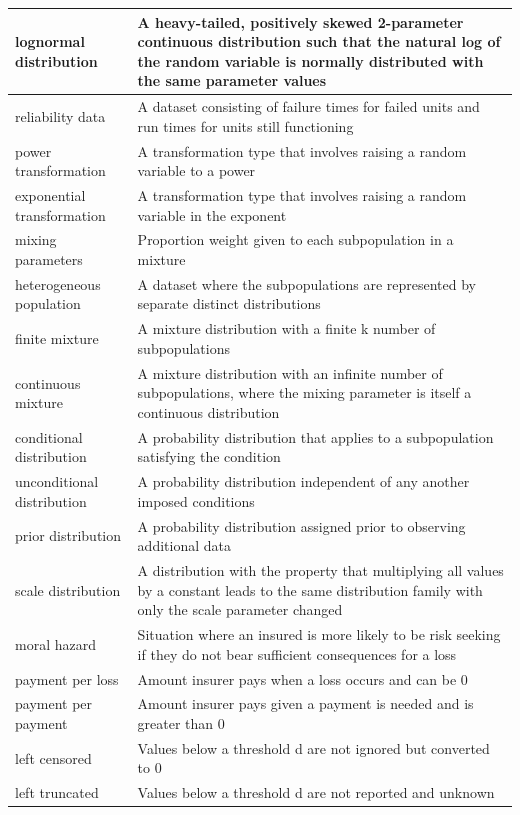 \documentclass[
]{book}
\begin{document}
\begin{longtable}{>{\raggedright\arraybackslash}p{10em}|>{\raggedright\arraybackslash}p{30em}}
\hline
lognormal distribution & A heavy-tailed, positively skewed 2-parameter continuous distribution such that the natural log of the random variable is normally distributed with the same parameter values\\
\hline
reliability data & A dataset consisting of failure times for failed units and run times for units still functioning\\
\hline
power transformation & A transformation type that involves raising a random variable to a power\\
\hline
exponential transformation & A transformation type that involves raising a random variable in the exponent\\
\hline
mixing parameters & Proportion weight given to each subpopulation in a mixture\\
\hline
heterogeneous population & A dataset where the subpopulations are represented by separate distinct distributions\\
\hline
finite mixture & A mixture distribution with a finite k number of subpopulations\\
\hline
continuous mixture & A mixture distribution with an infinite number of subpopulations, where the mixing parameter is itself a continuous distribution\\
\hline
conditional distribution & A probability distribution that applies to a subpopulation satisfying the condition\\
\hline
unconditional distribution & A probability distribution independent of any another imposed conditions\\
\hline
prior distribution & A probability distribution assigned prior to observing additional data\\
\hline
scale distribution & A distribution with the property that multiplying all values by a constant leads to the same distribution family with only the scale parameter changed\\
\hline
moral hazard & Situation where an insured is more likely to be risk seeking if they do not bear sufficient consequences for a loss\\
\hline
payment per loss & Amount insurer pays when a loss occurs and can be 0\\
\hline
payment per payment & Amount insurer pays given a payment is needed and is greater than 0\\
\hline
left censored & Values below a threshold d are not ignored but converted to 0\\
\hline
left truncated & Values below a threshold d are not reported and unknown\\

\end{longtable}
\end{document}
